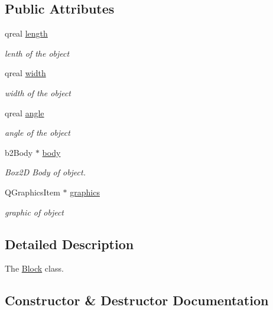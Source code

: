 \subsection*{Public Attributes}
\begin{DoxyCompactItemize}
\item 
qreal \hyperlink{class_block_a7ad40ed8c8d961b1ca2117835853a9c5}{length}
\begin{DoxyCompactList}\small\item\em lenth of the object \end{DoxyCompactList}\item 
qreal \hyperlink{class_block_af7693d02f586bf02df6181995a66b768}{width}
\begin{DoxyCompactList}\small\item\em width of the object \end{DoxyCompactList}\item 
qreal \hyperlink{class_block_ac19871a0cf41116b9585f34c3c21ec54}{angle}
\begin{DoxyCompactList}\small\item\em angle of the object \end{DoxyCompactList}\item 
b2\+Body $\ast$ \hyperlink{class_block_a5c9003f7f9cd6105465da994012085f8}{body}
\begin{DoxyCompactList}\small\item\em Box2D Body of object. \end{DoxyCompactList}\item 
Q\+Graphics\+Item $\ast$ \hyperlink{class_block_aab0690c05a4c1c8ee999647250b3e170}{graphics}
\begin{DoxyCompactList}\small\item\em graphic of object \end{DoxyCompactList}\end{DoxyCompactItemize}


\subsection{Detailed Description}
The \hyperlink{class_block}{Block} class. 

\subsection{Constructor \& Destructor Documentation}
